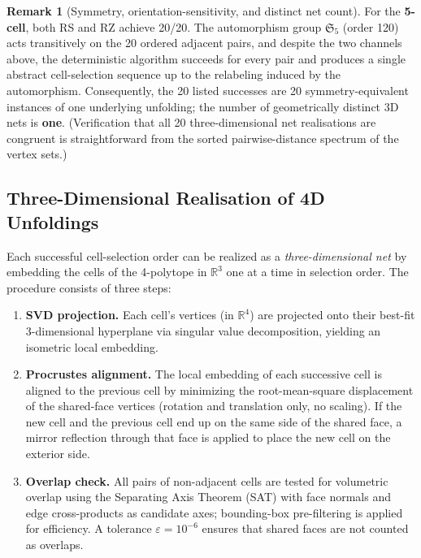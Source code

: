 \documentclass[12pt]{article}
\theoremstyle{definition}
\newtheorem{remark}{Remark}[section]
\begin{document}
\begin{remark}[Symmetry, orientation-sensitivity, and distinct net count]
For the \textbf{5-cell}, both RS and RZ achieve 20/20.
The automorphism group $\mathfrak{S}_5$ (order 120) acts transitively on
the 20 ordered adjacent pairs, and despite the two channels above,
the deterministic algorithm succeeds for every pair and produces a
single abstract cell-selection sequence up to the relabeling induced
by the automorphism.
Consequently, the 20 listed successes are 20 symmetry-equivalent instances
of one underlying unfolding; the number of geometrically distinct
3D nets is \textbf{one}.
(Verification that all 20 three-dimensional net realisations are congruent
is straightforward from the sorted pairwise-distance spectrum of the
vertex sets.)
\end{remark}

\subsection{Three-Dimensional Realisation of 4D Unfoldings}
\label{sec:3dreal}

Each successful cell-selection order can be realized as a
\emph{three-dimensional net} by embedding the cells of the 4-polytope
in $\mathbb{R}^3$ one at a time in selection order.
The procedure consists of three steps:

\begin{enumerate}[nosep]
  \item \textbf{SVD projection.}
        Each cell's vertices (in $\mathbb{R}^4$) are projected onto their
        best-fit 3-dimensional hyperplane via singular value decomposition,
        yielding an isometric local embedding.
  \item \textbf{Procrustes alignment.}
        The local embedding of each successive cell is aligned to the
        previous cell by minimizing the root-mean-square displacement of
        the shared-face vertices (rotation and translation only, no
        scaling).
        If the new cell and the previous cell end up on the same side of
        the shared face, a mirror reflection through that face is applied
        to place the new cell on the exterior side.
  \item \textbf{Overlap check.}
        All pairs of non-adjacent cells are tested for volumetric overlap
        using the Separating Axis Theorem (SAT) with face normals and
        edge cross-products as candidate axes; bounding-box pre-filtering
        is applied for efficiency.
        A tolerance $\varepsilon = 10^{-6}$ ensures that shared faces are
        not counted as overlaps.
\end{enumerate}
\end{document}
